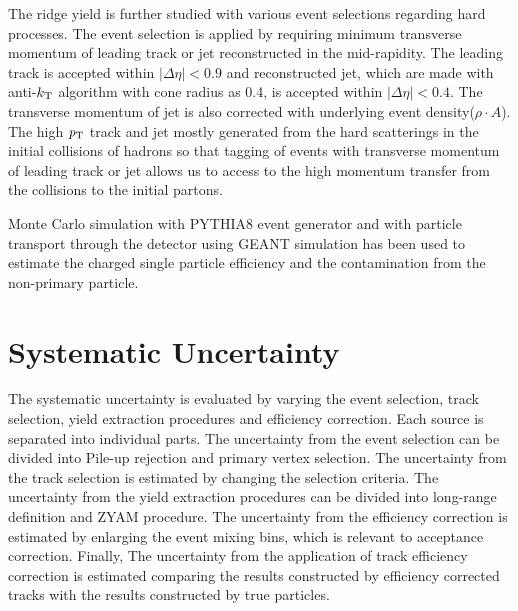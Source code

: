 The ridge yield is further studied with various event selections regarding hard processes. The event selection is applied by requiring minimum transverse momentum of leading track or jet reconstructed in the mid-rapidity. The leading track is accepted within $|\Delta\eta|<0.9$ and reconstructed jet, which are made with anti-$k_{\rm{T}}$ algorithm with cone radius as 0.4, is accepted within $|\Delta\eta|<0.4$. The transverse momentum of jet is also corrected with underlying event density($\rho \cdot A$). The high $\it{p}_{\rm{T}}$ track and jet mostly generated from the hard scatterings in the initial collisions of hadrons so that tagging of events with transverse momentum of leading track or jet allows us to access to the high momentum transfer from the collisions to the initial partons.

Monte Carlo simulation with PYTHIA8 event generator and with particle transport through the detector using GEANT simulation has been used to estimate the charged single particle efficiency and the contamination from the non-primary particle. 


\section{Systematic Uncertainty}
\label{sec:uncertainties}
The systematic uncertainty is evaluated by varying the event selection, track selection, yield extraction procedures and efficiency correction. Each source is separated into individual parts. The uncertainty from the event selection can be divided into Pile-up rejection and primary vertex selection. The uncertainty from the track selection is estimated by changing the selection criteria. The uncertainty from the yield extraction procedures can be divided into long-range definition and ZYAM procedure. The uncertainty from the efficiency correction is estimated by enlarging the event mixing bins, which is relevant to acceptance correction. Finally, The uncertainty from the application of track efficiency correction is estimated comparing the results constructed by efficiency corrected tracks with the results constructed by true particles.

